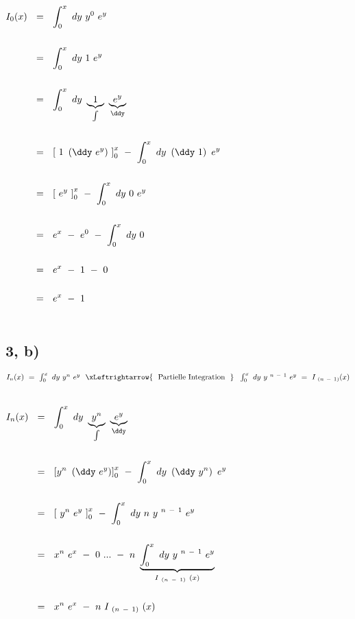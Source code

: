 	~\\ $\begin{aligned}[t]
		I_0(x) ~~ &= ~~ \int_{0}^{x} ~ dy ~ y^0 ~ e^y \\ \\
		&= ~~ \int_{0}^{x} ~ dy ~ 1 ~ e^y \\ \\
		&= ~~ \int_{0}^{x} ~ dy ~ \underbrace{1}_{ \int } ~ \underbrace{ e^y }_{ \ddy } \\ \\
		&= ~~ \left[ ~ 1 ~ \left( \ddy ~ e^y \right) ~ \right]_{0}^{x} ~ - ~ \int_{0}^{x} ~ dy ~ \left( \ddy ~ 1 \right) ~ e^y \\ \\
		&= ~~ \left[ ~ e^y ~ \right]_{0}^{x} ~ - ~ \int_{0}^{x} ~ dy ~ 0 ~ e^y \\ \\
		&= ~~ e^x ~ - ~ e^0 ~ - ~ \int_{0}^{x} ~ dy ~ 0 \\ \\
		&= ~~ e^x ~ - ~ 1 ~ - ~ 0 \\ \\
		&= ~~ e^x ~ - ~ 1 \\ \\
	\end{aligned}$
	
	\newpage
	


\subsection*{3, b)}
	
	$I_n(x) ~ = ~ \int_{0}^{x} ~ dy ~ y^n ~ e^y ~~ \xLeftrightarrow{\text{~ Partielle Integration ~}} ~~ \int_{0}^{x} ~ dy ~ y^{ ~ n ~ - ~ 1} ~ e^y ~ = ~ I_{~ (n ~ - ~ 1)}(x)$
	
	~\\
	
	$\begin{aligned}[t]
	I_n(x) ~~ &= ~~ \int_{0}^{x} ~ dy ~ \underbrace{ y^n }_{ \int } ~ \underbrace{ e^y }_{ \ddy } \\ \\
	&= ~~ \left[ y^n ~ \left( \ddy ~ e^y \right) \right]_{ 0 }^{ x } ~ - ~ \int_{0}^{x} ~ dy ~ \left( \ddy ~ y^n \right) ~ e^y \\ \\
	&= ~~ \left[ ~ y^n ~ e^y ~ \right]_{ 0 }^{ x } ~ - ~ \int_{0}^{x} ~ dy ~ n ~ y^{ ~ n ~ - ~ 1} ~ e^y \\ \\
	&= ~~ x^n ~ e^x ~ - ~ 0 ~ ... ~ - ~ n ~ \underbrace{ \int_{0}^{x} ~ dy ~ y^{ ~ n ~ - ~ 1} ~ e^y }_{ I_{~ (n ~ - ~ 1) ~}(x) } \\ \\
	&= ~~ x^n ~ e^x ~ - ~ n ~ I_{~ (n ~ - ~ 1) ~}(x) \\ \\
	\end{aligned}$ ~\\ 
	


